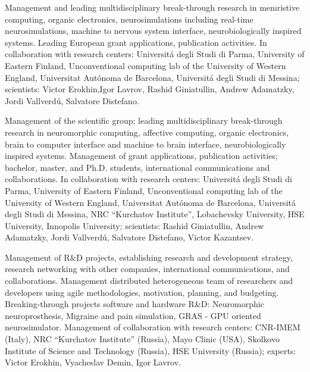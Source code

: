 \documentclass{moderncv}
\begin{document}
    {Management and leading multidisciplinary break-through research in memristive computing, organic electronics, neurosimulations including real-time neurosimulations, machine to nervous system interface, neurobiologically inspired systems. Leading European grant applications, publication activities. In collaboration with research centers: Universit\'{a} degli Studi di Parma, University of Eastern Finland, Unconventional computing lab of the University of Western England, Universitat Aut\'onoma de Barcelona, Universit\'{a} degli Studi di Messina; scientists: Victor Erokhin,Igor Lavrov, Rashid Giniatullin, Andrew Adamatzky, Jordi Vallverd\'{u}, Salvatore Distefano.}
    
    {Management of the scientific group; leading multidisciplinary break-through research in neuromorphic computing, affective computing, organic electronics, brain to computer interface and machine to brain interface, neurobiologically inspired systems. Management of grant applications, publication activities; bachelor, master, and Ph.D. students, international communications and collaborations. In collaboration with research centers: Universit\'{a} degli Studi di Parma, University of Eastern Finland, Unconventional computing lab of the University of Western England, Universitat Aut\'onoma de Barcelona, Universit\'{a} degli Studi di Messina, NRC “Kurchatov Institute”, Lobachevsky University, HSE University, Innopolis University; scientists: Rashid Giniatullin, Andrew Adamatzky, Jordi Vallverd\'{u}, Salvatore Distefano, Victor Kazantsev.}

    {Management of R\&D projects, establishing research and development strategy, research networking with other companies, international communications, and collaborations. Management distributed heterogeneous team of researchers and developers using agile methodologies, motivation, planning, and budgeting. Breaking-through projects software and hardware R\&D: Neuromorphic neuroprosthesis, Migraine and pain simulation, GRAS - GPU oriented neurosimulator. Management of collaboration with research centers: CNR-IMEM (Italy), NRC “Kurchatov Institute” (Russia), Mayo Clinic (USA), Skolkovo Institute of Science and Technology (Russia), HSE University (Russia); experts: Victor Erokhin, Vyacheslav Demin, Igor Lavrov. }
\end{document}
